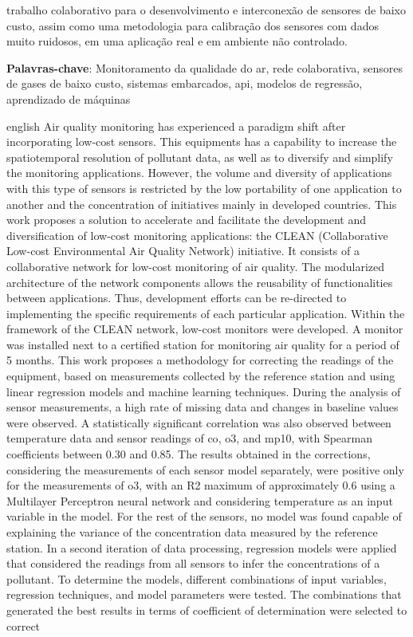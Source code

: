 \begin{resumo}
trabalho colaborativo para o desenvolvimento e interconexão de sensores de baixo custo, assim como uma metodologia para calibração dos sensores com dados muito ruidosos, em uma aplicação real e em ambiente não controlado.
	
	\textbf{Palavras-chave}: Monitoramento da qualidade do ar, rede colaborativa, sensores de gases de baixo custo, sistemas embarcados, \acrshort{api}, modelos de regressão, aprendizado de máquinas
\end{resumo}

\begin{resumo}[Abstract]
	\SingleSpacing
	\begin{otherlanguage*}{english}
		Air quality monitoring has experienced a paradigm shift after incorporating  low-cost sensors. This equipments has a capability to increase the spatiotemporal resolution of pollutant data, as well as to diversify and simplify the monitoring applications. However, the volume and diversity of applications with this type of sensors is restricted by the low portability of one application to another and the concentration of initiatives mainly in developed countries. This work proposes a solution to accelerate and facilitate the development and diversification of low-cost monitoring applications: the CLEAN (Collaborative Low-cost Environmental Air Quality Network) initiative. It consists of a collaborative network for low-cost monitoring of air quality. The modularized architecture of the network components allows the reusability of functionalities between applications. Thus, development efforts can be re-directed to implementing the specific requirements of each particular application. Within the framework of the CLEAN network, low-cost monitors were developed. A monitor was installed next to a certified station for monitoring air quality for a period of 5 months. This work proposes a methodology for correcting the readings of the equipment, based on measurements collected by the reference station and using linear regression models and machine learning techniques. During the analysis of sensor measurements, a high rate of missing data and changes in baseline values were observed. A statistically significant correlation was also observed between temperature data and sensor readings of \acrshort{co}, \acrshort{o3}, and \acrshort{mp10}, with Spearman coefficients between 0.30 and 0.85. The results obtained in the corrections, considering the measurements of each sensor model separately, were positive only for the measurements of \acrshort{o3}, with an R2 maximum of approximately 0.6 using a Multilayer Perceptron neural network and considering temperature as an input variable in the model. For the rest of the sensors, no model was found capable of explaining the variance of the concentration data measured by the reference station. In a second iteration of data processing, regression models were applied that considered the readings from all sensors to infer the concentrations of a pollutant. To determine the models, different combinations of input variables, regression techniques, and model parameters were tested. The combinations that generated the best results in terms of coefficient of determination were selected to correct 
\end{otherlanguage*}
\end{resumo}
